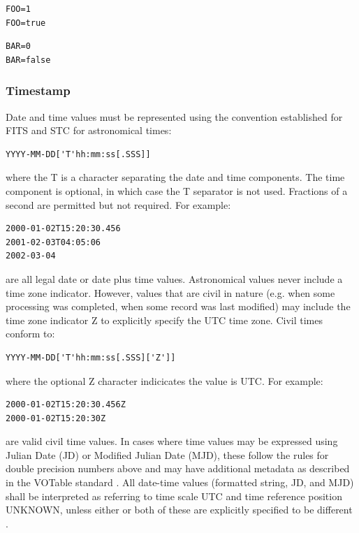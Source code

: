 \documentclass[11pt,letter]{ivoa}
\begin{document}
\begin{verbatim}
FOO=1
FOO=true
\end{verbatim}

\begin{verbatim}
BAR=0
BAR=false
\end{verbatim}

\subsubsection{Timestamp}
Date and time values must be represented  using the convention established for 
FITS \citep{std:FITS} and STC \citep{std:STC} for astronomical times:

\begin{verbatim}
YYYY-MM-DD['T'hh:mm:ss[.SSS]]
\end{verbatim}

where the  T is a character separating the date and time components. The time 
component is optional, in which case the T separator is not used. Fractions of a 
second are permitted but not required. For example:

\begin{verbatim}
2000-01-02T15:20:30.456
2001-02-03T04:05:06
2002-03-04
\end{verbatim}

are all legal date or date plus time values. Astronomical values never 
include a time zone indicator. However, values that 
are civil in nature (e.g. when some processing was completed, when some record 
was last modified) may include the time zone indicator Z to explicitly specify 
the UTC time zone. Civil times conform to:

\begin{verbatim}
YYYY-MM-DD['T'hh:mm:ss[.SSS]['Z']]
\end{verbatim}

where the optional Z character indicicates the value is UTC. For example:

\begin{verbatim}
2000-01-02T15:20:30.456Z
2000-01-02T15:20:30Z
\end{verbatim}

are valid civil time values. In cases where time values may be 
expressed using Julian Date (JD) or Modified Julian Date (MJD), these follow the 
rules for double precision numbers above and may have additional metadata as 
described in the VOTable standard \citep{std:VOTABLE}. All date-time values (formatted string, JD, 
and MJD) shall be interpreted as referring to time scale UTC and time reference 
position UNKNOWN, unless either or both of these are explicitly specified to be 
different \citep{std:STC}. 
\end{document}
